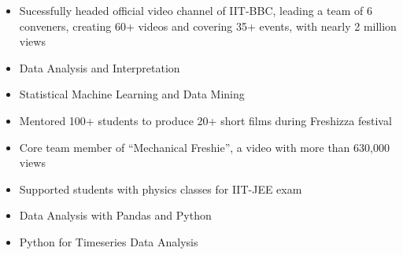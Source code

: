 \documentclass[10pt,a4paper,ragged2e,withhyper]{altacv}
\begin{document}
\begin{paracol}{2}
\divider
{}
\begin{itemize}
\item Sucessfully headed official video channel of IIT-BBC, leading a team of 6 conveners, creating 60+ videos and covering 35+ events, with nearly 2 million views
\item Data Analysis and Interpretation
\item Statistical Machine Learning and Data Mining
\end{itemize}



\label{sec:org029ad46}

\begin{itemize}
\item Mentored 100+ students to produce 20+ short films during Freshizza festival
\item Core team member of ``Mechanical Freshie'', a video with more than 630,000 views
\item Supported students with physics classes for IIT-JEE exam
\end{itemize}

\label{sec:orga9fa4ec}

\begin{itemize}
\item Data Analysis with Pandas and Python
\item Python for Timeseries Data Analysis
\end{itemize}

\end{paracol}
\end{document}
